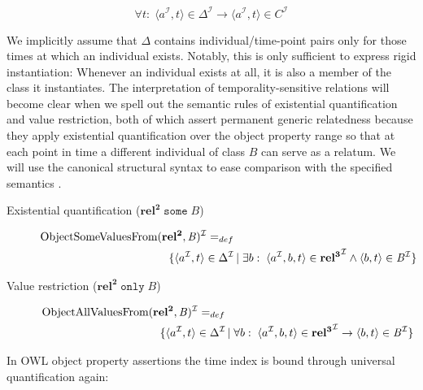 \documentclass[10pt]{bmc_article}
\newcommand{\mirel}[1]{\ensuremath{\mathrm{\mathbf{#1}}}}
\newcommand{\mclass}[1]{\ensuremath{\mathit{#1}}}
\newcommand{\mrel}[2]{\mirel{#1^#2}}
\newcommand{\mrelb}[1]{\mrel{#1}{2}}
\newcommand{\mrelt}[1]{\mrel{#1}{3}}
\newcommand{\dlint}[1]{\ensuremath{#1^{\mathcal{I}}}}
\newcommand{\pair}[2]{\ensuremath{\langle #1,#2\rangle}}
\newenvironment{bmcformat}{\baselineskip20pt\sloppy\setboolean{publ}{false}}{\baselineskip20pt\sloppy}
\begin{document}
\begin{bmcformat}
\begin{equation}
\forall t:\;\pair{\dlint{a}}{t}\in \dlint{\Delta} \rightarrow
\pair{\dlint{a}}{t} \in \dlint{\mclass{C}}
\end{equation}

We implicitly assume that $\Delta$ contains individual/time-point pairs only for
those times at which an individual exists. Notably, this is only sufficient to express rigid instantiation: Whenever an individual exists at
all, it is also a member of the class it instantiates. The interpretation of
temporality-sensitive relations will become clear when we spell out the semantic
rules of existential quantification and value restriction, both of which assert
permanent generic relatedness because they apply existential quantification over the
object property range so that at each point in time a different individual of
class \mclass{B} can serve as a relatum. We will use the canonical structural syntax
\cite{OWL2:structural}
to ease comparison with the specified semantics \cite{OWL2:direct}.

\begin{description}
\item[Existential quantification ($\mrelb{rel}\;\mathtt{some}\;\mclass{B}$)]
\begin{equation}
\begin{split}
\dlint{\text{ObjectSomeValuesFrom}&(\mrelb{rel},\mclass{B})} =_{def}\\ &\quad
\{\pair{\dlint{a}}{t}\in \dlint{\Delta}\,|\; \exists b:\;\langle\dlint{a},b,t\rangle
\in \dlint{\mrelt{rel}} \wedge \pair{b}{t} \in \dlint{\mclass{B}}\}
\end{split}
\end{equation} 
\item[Value restriction ($\mrelb{rel}\;\mathtt{only}\;\mclass{B}$)]
\begin{equation}
\begin{split}
\dlint{\text{ObjectAllValuesFrom}&(\mrelb{rel},\mclass{B})} =_{def}\\ &\quad
\{\pair{\dlint{a}}{t}\in \dlint{\Delta}\,|\; \forall b:\;\langle\dlint{a},b,t\rangle
\in \dlint{\mrelt{rel}} \rightarrow \pair{b}{t} \in \dlint{\mclass{B}}\}
\end{split}
\end{equation}
\end{description}

In OWL object property assertions the time index is bound through universal
quantification again:


\end{bmcformat}
\end{document}
